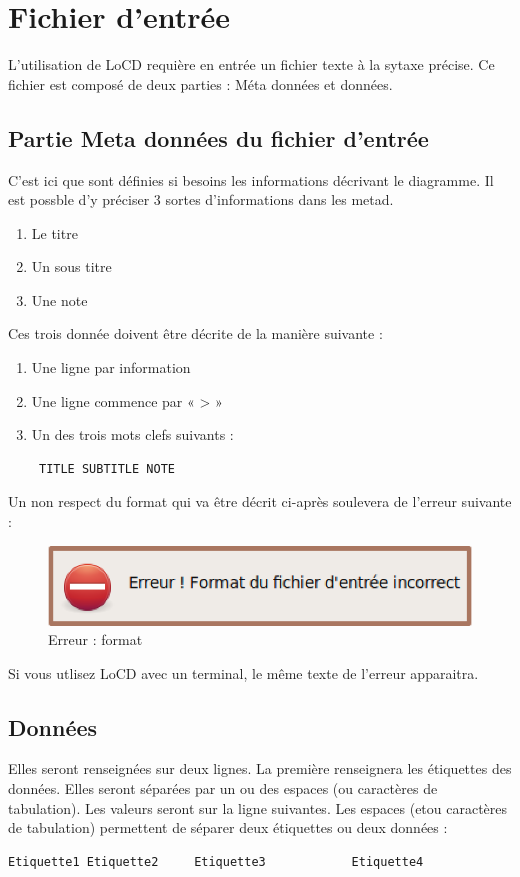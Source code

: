 \chapter{Fichier d'entrée}
\label{chap:fichDonnees}
L'utilisation de LoCD requière en entrée un fichier texte à la sytaxe précise. Ce fichier est composé de deux parties : Méta données et données.
\section{Partie Meta données du fichier d'entrée}
C'est ici que sont définies si besoins les informations décrivant le diagramme. Il est possble d'y préciser 3 sortes d'informations dans les \gls{metad}. 
\begin{enumerate}
\item
  Le titre 
\item
  Un sous titre
\item
  Une note
\end{enumerate}
Ces trois donnée doivent être décrite de la manière suivante : 
\begin{enumerate}
\item
  Une ligne par information 
\item
  Une ligne commence par  « > »
\item
  Un des trois mots clefs suivants : \begin{verbatim} TITLE SUBTITLE NOTE \end{verbatim}
\end{enumerate}
Un non respect du format qui va être décrit ci-après soulevera de l'erreur suivante  : 
\begin{figure}[htbp]
  \centering
  \includegraphics[scale=0.40]{img/eformatfichier}
  \caption{Erreur : format}
  \label{fig:enbdonees}
\end{figure}
Si vous utlisez LoCD avec un terminal, le même texte de l'erreur apparaitra.



\section{Données}
Elles seront renseignées sur deux lignes. La première renseignera les étiquettes des données. Elles seront séparées par un ou des espaces (ou caractères de tabulation). Les valeurs seront sur la ligne suivantes. Les espaces (et\/ou caractères de tabulation) permettent de séparer deux étiquettes ou deux données :
\begin{verbatim}
Etiquette1 Etiquette2     Etiquette3 			Etiquette4
 \end{verbatim} 
 
